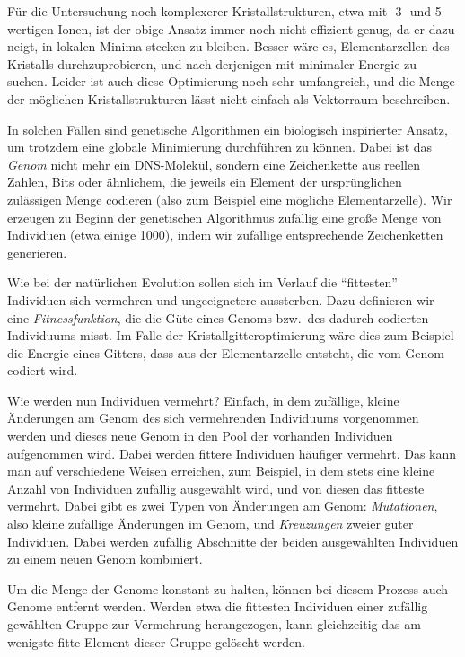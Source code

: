 Für die Untersuchung noch komplexerer Kristallstrukturen, etwa mit -3-
und 5-wertigen Ionen, ist der obige Ansatz immer noch nicht effizient
genug, da er dazu neigt, in lokalen Minima stecken zu bleiben. Besser
wäre es, Elementarzellen des Kristalls durchzuprobieren, und nach
derjenigen mit minimaler Energie zu suchen. Leider ist auch diese
Optimierung noch sehr umfangreich, und die Menge der möglichen
Kristallstrukturen lässt nicht einfach als Vektorraum beschreiben.

In solchen Fällen sind genetische Algorithmen ein biologisch
inspirierter Ansatz, um trotzdem eine globale Minimierung durchführen
zu können. Dabei ist das \emph{Genom} nicht mehr ein DNS-Molekül,
sondern eine Zeichenkette aus reellen Zahlen, Bits oder ähnlichem, die
jeweils ein Element der ursprünglichen zulässigen Menge codieren (also
zum Beispiel eine mögliche Elementarzelle). Wir erzeugen zu Beginn der
genetischen Algorithmus zufällig eine große Menge von Individuen (etwa
einige 1000), indem wir zufällige entsprechende Zeichenketten
generieren.

Wie bei der natürlichen Evolution sollen sich im Verlauf die
"`fittesten"' Individuen sich vermehren und ungeeignetere aussterben.
Dazu definieren wir eine \emph{Fitnessfunktion}, die die Güte eines
Genoms bzw.\ des dadurch codierten Individuums misst. Im Falle der
Kristallgitteroptimierung wäre dies zum Beispiel die Energie eines
Gitters, dass aus der Elementarzelle entsteht, die vom Genom codiert
wird.

Wie werden nun Individuen vermehrt? Einfach, in dem zufällige, kleine
Änderungen am Genom des sich vermehrenden Individuums vorgenommen
werden und dieses neue Genom in den Pool der vorhanden Individuen
aufgenommen wird. Dabei werden fittere Individuen häufiger
vermehrt. Das kann man auf verschiedene Weisen erreichen, zum
Beispiel, in dem stets eine kleine Anzahl von Individuen zufällig
ausgewählt wird, und von diesen das fitteste vermehrt.  Dabei gibt es
zwei Typen von Änderungen am Genom: \emph{Mutationen}, also kleine
zufällige Änderungen im Genom, und \emph{Kreuzungen} zweier guter
Individuen. Dabei werden zufällig Abschnitte der beiden ausgewählten
Individuen zu einem neuen Genom kombiniert.

Um die Menge der Genome konstant zu halten, können bei diesem Prozess
auch Genome entfernt werden. Werden etwa die fittesten Individuen
einer zufällig gewählten Gruppe zur Vermehrung herangezogen, kann
gleichzeitig das am wenigste fitte Element dieser Gruppe gelöscht
werden.

